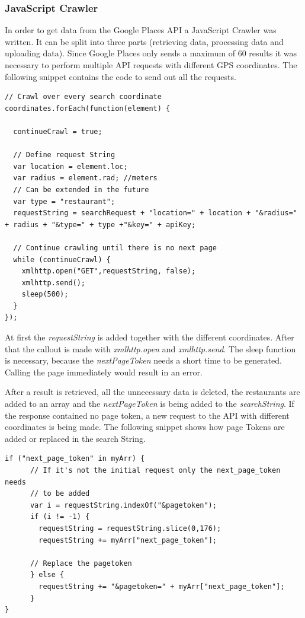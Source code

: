 \subsubsection{JavaScript Crawler}
In order to get data from the Google Places API a JavaScript Crawler was written. It can be split into three parts (retrieving data, processing data and uploading data). Since Google Places only sends a maximum of 60 results it was necessary to perform multiple API requests with different GPS coordinates. The following snippet contains the code to send out all the requests.

\begin{lstlisting}
// Crawl over every search coordinate
coordinates.forEach(function(element) {

  continueCrawl = true;

  // Define request String
  var location = element.loc;
  var radius = element.rad; //meters
  // Can be extended in the future
  var type = "restaurant";
  requestString = searchRequest + "location=" + location + "&radius=" + radius + "&type=" + type +"&key=" + apiKey;
  
  // Continue crawling until there is no next page
  while (continueCrawl) {
    xmlhttp.open("GET",requestString, false);
    xmlhttp.send();
    sleep(500);
  }
});
\end{lstlisting}

At first the \textit{requestString} is added together with the different coordinates. After that the callout is made with \textit{xmlhttp.open} and \textit{xmlhttp.send}. The sleep function is necessary, because the \textit{nextPageToken} needs a short time to be generated. Calling the page immediately would result in an error.

After a result is retrieved, all the unnecessary data is deleted, the restaurants are added to an array and the \textit{nextPageToken} is being added to the \textit{searchString}. If the response contained no page token, a new request to the API with different coordinates is being made. The following snippet shows how page Tokens are added or replaced in the search String.
\begin{lstlisting}
if ("next_page_token" in myArr) {
      // If it's not the initial request only the next_page_token needs
      // to be added
      var i = requestString.indexOf("&pagetoken");
      if (i != -1) {
        requestString = requestString.slice(0,176);
        requestString += myArr["next_page_token"];

      // Replace the pagetoken
      } else {
        requestString += "&pagetoken=" + myArr["next_page_token"];     
      }
}
\end{lstlisting}

